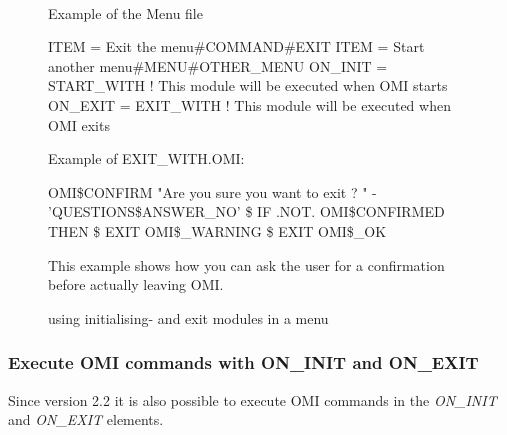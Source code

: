 \documentclass[a4paper]{book}
\renewcommand{\indent}{\hspace*{5mm}}
\begin{document}
\begin{figure}[h!tb]
\begin{minipage}[h!tb]{\textwidth}
\hrulefill \\
\noindent Example of the Menu file\newline
\begin{ttfamily}\begin{small}
 \newline
\indent ITEM = Exit the menu{\#}COMMAND{\#}EXIT \newline
\indent ITEM = Start another menu{\#}MENU{\#}OTHER{\_}MENU \newline
\indent ON{\_}INIT = START{\_}WITH ! This module will be executed when OMI starts \newline
\indent ON{\_}EXIT = EXIT{\_}WITH ! This module will be executed when OMI exits \newline
\end{small}\end{ttfamily}
\vspace{1mm} 
\noindent Example of EXIT{\_}WITH.OMI:\newline
\begin{ttfamily}\begin{small}
\noindent{\$} OMI{\$}CONFIRM "Are you sure you want to exit ? " - \newline
\indent 'QUESTIONS{\$}ANSWER{\_}NO'
{\$} IF .NOT. OMI{\$}CONFIRMED THEN {\$} EXIT OMI{\$}{\_}WARNING \newline
{\$} EXIT OMI{\$}{\_}OK\newline
\end{small}\end{ttfamily}
\noindent This example shows how you can ask the user for a confirmation before 
actually leaving OMI.
\caption{using initialising- and exit modules in a menu}\label{fig:iemods}
\hrulefill
\end{minipage}
\end{figure}

\subsubsection{Execute OMI commands with ON{\_}INIT and ON{\_}EXIT}

Since version 2.2 it is also possible to execute OMI commands in the
\textsl{ON{\_}INIT} and
\textsl{ON{\_}EXIT} elements.
\end{document}

